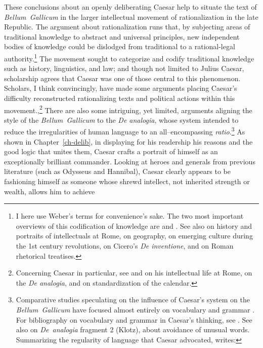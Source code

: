 \documentclass[12pt,letterpaper,oneside,final]{memoir}
\begin{document}
These conclusions about an openly deliberating Caesar help to situate the text of \emph{Bellum~Gallicum} in the larger intellectual movement of rationalization in the late Republic. The argument about rationalization runs that, by subjecting areas of traditional knowledge to abstract and universal principles, new independent bodies of knowledge could be dislodged from traditional to a rational-legal authority.\footnote{I here use Weber's terms for convenience's sake. The two most important overviews of this codification of knowledge are \textcite{moatti1997} and \textcite{wallacehadrill2008}. See also \textcite{rawson1985} on history and portraits of intellectuals at Rome, \textcite{nicolet1988} on geography, \textcite{wallacehadrill1997} on emerging culture during the 1st century revolutions, \textcite{kastely2002} on Cicero's \emph{De inventione}, and \textcite[65--76]{connolly2007} on Roman rhetorical treatises.} The movement sought to categorize and codify traditional knowledge such as history, linguistics, and law; and though not limited to Julius Caesar, scholarship agrees that Caesar was one of those central to this phenomenon. Scholars, I think convincingly, have made some arguments placing Caesar's difficulty reconstructed rationalizing texts and political actions within this movement.,\footnote{Concerning Caesar in particular, see \textcite[109--114]{rawson1985} and \textcite{fantham2009} on his intellectual life at Rome, \textcite{sinclair1993,sinclair1994} on the \emph{\textlatin{De analogia}}, and \textcite{feeney2007} on standardization of the calendar.} There are also some intriguing, yet limited, arguments aligning the style of the \emph{Bellum~Gallicum} to the \emph{\textlatin{De analogia}}, whose system intended to reduce the irregularities of human language to an all--encompassing \emph{ratio}.\footnote{Comparative studies speculating on the influence of Caesar's system on the \emph{Bellum~Gallicum} have focused almost entirely on vocabulary and grammar \parencite[e.g.,][17--19]{hall1998}. For bibliography on vocabulary and grammar in Caesar's thinking, see \textcite[p.~229, n.~1]{willi2010}. See also \textcite[94--95]{sinclair1994} on \emph{De~analogia} fragment 2 (Klotz), about avoidance of unusual words. Summarizing the regularity of language that Caesar advocated, \textcite[95]{sinclair1994} writes: } As shown in Chapter~\ref{ch-delib}, in displaying for his readership his reasons and the good logic that unites them, Caesar crafts a portrait of himself as an exceptionally brilliant commander. Looking at heroes and generals from previous literature (such as Odysseus and Hannibal), Caesar clearly appears to be fashioning himself as someone whose shrewd intellect, not inherited strength or wealth, allows him to achieve 
\end{document}
